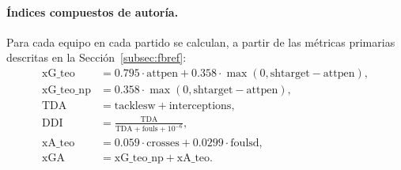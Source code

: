 \paragraph{\'Indices compuestos de autor\'ia.} Para cada equipo en cada partido se calculan, a partir de las m\'etricas primarias descritas en la Secci\'on~\ref{subsec:fbref}:
\begin{align}
	\text{xG\_teo} &= 0{.}795 \cdot \text{attpen} + 0{.}358 \cdot \max(0, \text{shtarget} - \text{attpen}), \label{eq:xg_teo_impl}\\
	\text{xG\_teo\_np} &= 0{.}358 \cdot \max(0, \text{shtarget} - \text{attpen}),\\
	\text{TDA} &= \text{tacklesw} + \text{interceptions},\\
	\text{DDI} &= \frac{\text{TDA}}{\text{TDA} + \text{fouls} + 10^{-6}}, \label{eq:ddi_impl}\\
	\text{xA\_teo} &= 0{.}059 \cdot \text{crosses} + 0{.}0299 \cdot \text{foulsd},\\
	\text{xGA} &= \text{xG\_teo\_np} + \text{xA\_teo}.
\end{align}

